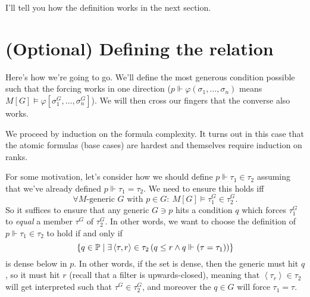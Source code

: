 I'll tell you how the definition works in the next section.

\section{(Optional) Defining the relation}
Here's how we're going to go.
We'll define the most generous condition possible such that
the forcing works in one direction ($p \Vdash \varphi(\sigma_1, \dots, \sigma_n)$ means
$M[G] \vDash \varphi[\sigma_1^G, \dots, \sigma_n^G]$).
We will then cross our fingers that the converse also works.

We proceed by induction on the formula complexity.
It turns out in this case that the atomic formulas (base cases)
are hardest and themselves require induction on ranks.

For some motivation, let's consider how we should define
$p \Vdash \tau_1 \in \tau_2$ assuming that we've
already defined $p \Vdash \tau_1 = \tau_2$.
We need to ensure this holds iff
\[ \forall \text{$M$-generic $G$ with $p \in G$}:
	\ M[G] \vDash \tau_1^G \in \tau_2^G. \]
So it suffices to ensure that any generic $G \ni p$ hits a condition $q$ which forces $\tau_1^G$ to \emph{equal} a member $\tau^G$ of $\tau_2^G$.
In other words, we want to choose the definition of $p \Vdash \tau_1 \in \tau_2$ to hold if and only if
\[
	\left\{ q \in \mathbb P
		\mid \exists \left<\tau, r\right> \in \tau_2
		\left( q \le r \land q \Vdash(\tau=\tau_1) \right) \right\}
\]
is dense below in $p$.
In other words, if the set is dense, then the generic must hit $q$, so it must hit $r$
(recall that a filter is upwards-closed),
meaning that $\left<\tau_r\right> \in \tau_2$ will get interpreted such that $\tau^G \in \tau_2^G$, and moreover the $q \in G$ will force $\tau_1 = \tau$.

